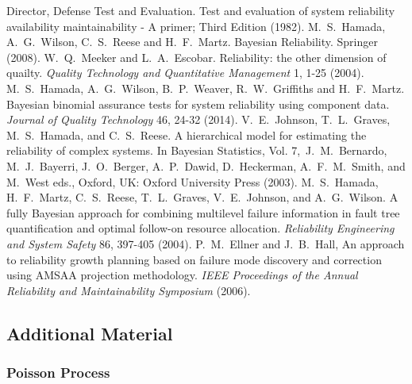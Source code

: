 \documentclass[12pt]{article}
\begin{document}
\begin{thebibliography}{99}
 Director, Defense Test and Evaluation. Test and evaluation of system reliability availability maintainability - A primer; Third Edition (1982).
 M.\ S.\ Hamada, A.\ G.\ Wilson, C.\ S.\ Reese and H.\ F.\ Martz. Bayesian Reliability. Springer (2008).
 W.\ Q.\ Meeker and L.\ A.\ Escobar. Reliability: the other dimension of quailty. \textit{Quality Technology and Quantitative Management} 1, 1-25 (2004).
 M.\ S.\ Hamada, A.\ G.\ Wilson, B.\ P.\ Weaver, R.\ W.\ Griffiths and H.\ F.\ Martz. Bayesian binomial assurance tests for system reliability using component data. \textit{Journal of Quality Technology} 46, 24-32 (2014).
 V.\ E.\ Johnson, T.\ L.\ Graves, M.\ S.\ Hamada, and C.\ S.\ Reese. A hierarchical model for estimating the reliability of complex systems. In Bayesian Statistics, Vol. 7,\ J.\ M.\ Bernardo, M.\ J.\ Bayerri, J.\ O.\ Berger, A.\ P.\ Dawid, D.\ Heckerman, A.\ F.\ M.\ Smith, and M.\ West eds., Oxford, UK: Oxford University Press (2003).
 M.\ S.\ Hamada, H.\ F.\ Martz, C.\ S.\ Reese, T.\ L.\ Graves, V.\ E.\ Johnson, and A.\ G.\ Wilson. A fully Bayesian approach
for combining multilevel failure information in fault tree quantification and optimal follow-on resource allocation. \textit{Reliability Engineering and System Safety} 86, 397-405 (2004).
 P.\ M.\ Ellner and J.\ B.\ Hall, An approach to reliability growth planning based on failure mode discovery and correction using AMSAA projection methodology. \textit{IEEE Proceedings of the Annual Reliability and Maintainability Symposium} (2006).
\end{thebibliography}

\newpage

\subsection{Additional Material}
\subsubsection{Poisson Process}
\end{document}
